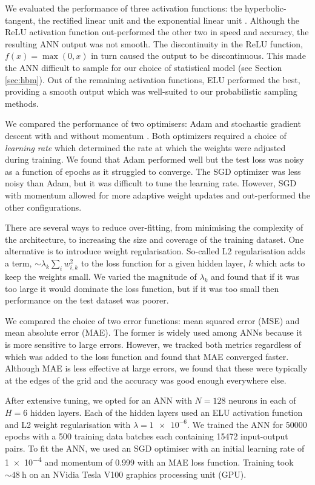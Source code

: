 \documentclass[a4paper,fleqn,usenatbib]{mnras}
\begin{document}
We evaluated the performance of three activation functions: the hyperbolic-tangent, the rectified linear unit \citep[ReLU;][]{Hahnloser.Sarpeshkar.ea2000, Glorot.Bordes.ea2011} and the exponential linear unit \citep[ELU;][]{Clevert.Unterthiner.ea2015}. Although the ReLU activation function out-performed the other two in speed and accuracy, the resulting ANN output was not smooth. The discontinuity in the ReLU function, $f(x) = \max(0, x)$ in turn caused the output to be discontinuous. This made the ANN difficult to sample for our choice of statistical model (see Section \ref{sec:hbm}). Out of the remaining activation functions, ELU performed the best, providing a smooth output which was well-suited to our probabilistic sampling methods.

We compared the performance of two optimisers: Adam \citep{Kingma.Ba2014} and stochastic gradient descent \citep[SGD; see e.g.][]{Ruder2016} with and without momentum \citep{Qian1999}. Both optimizers required a choice of \emph{learning rate} which determined the rate at which the weights were adjusted during training. We found that Adam performed well but the test loss was noisy as a function of epochs as it struggled to converge. The SGD optimizer was less noisy than Adam, but it was difficult to tune the learning rate. However, SGD with momentum allowed for more adaptive weight updates and out-performed the other configurations.

There are several ways to reduce over-fitting, from minimising the complexity of the architecture, to increasing the size and coverage of the training dataset. One alternative is to introduce weight regularisation. So-called L2 regularisation adds a term, $\sim \lambda_k \sum_i w_{i, k}^2$ to the loss function for a given hidden layer, $k$ which acts to keep the weights small. We varied the magnitude of $\lambda_k$ and found that if it was too large it would dominate the loss function, but if it was too small then performance on the test dataset was poorer.

We compared the choice of two error functions: mean squared error (MSE) and mean absolute error (MAE). The former is widely used among ANNs because it is more sensitive to large errors. However, we tracked both metrics regardless of which was added to the loss function and found that MAE converged faster. Although MAE is less effective at large errors, we found that these were typically at the edges of the grid and the accuracy was good enough everywhere else.

After extensive tuning, we opted for an ANN with $N=128$ neurons in each of $H=6$ hidden layers. Each of the hidden layers used an ELU activation function and L2 weight regularisation with $\lambda = \num{1e-6}$. We trained the ANN for \num{50000} epochs with a \num{500} training data batches each containing \num{15472} input-output pairs. To fit the ANN, we used an SGD optimiser with an initial learning rate of \num{1e-4} and momentum of \num{0.999} with an MAE loss function. Training took $\sim \SI{48}{\hour}$ on an NVidia Tesla V100 graphics processing unit (GPU).
\end{document}
